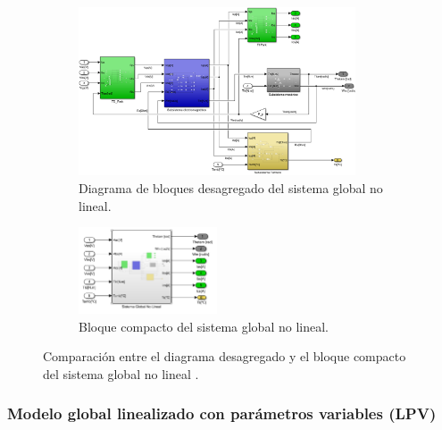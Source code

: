 \documentclass{article}
\begin{document}
\begin{figure}[H]
    \centering
    \begin{subfigure}[t]{\textwidth}
        \centering
        \includegraphics[width=0.9\textwidth]{Imagenes/Diagrama_Global_NoLineal.png}
        \caption{Diagrama de bloques desagregado del sistema global no lineal.}
        \label{fig:bloques_global_nolineal}
    \end{subfigure}
    
    \vspace{0.5cm} %
    
    \begin{subfigure}[t]{\textwidth}
        \centering
        \includegraphics[width=0.45\textwidth]{Imagenes/CompactoGlobalNoLineal.png}
        \caption{Bloque compacto del sistema global no lineal.}
        \label{fig:modelo_global_nolineal}
    \end{subfigure}
    
    \caption{Comparación entre el diagrama desagregado y el bloque compacto del sistema global no lineal .}
    \label{fig:bloques_global}
\end{figure}



\subsubsection{Modelo global linealizado con parámetros variables (LPV)}
\end{document}
